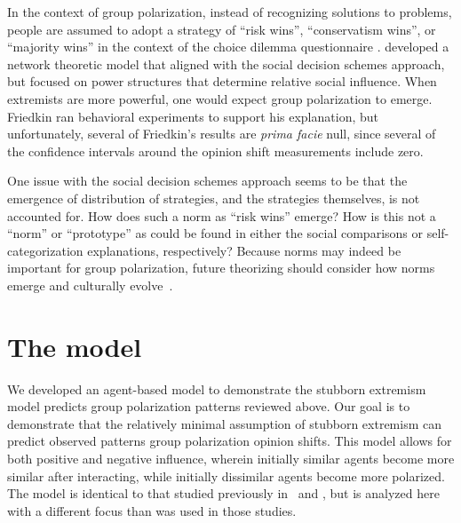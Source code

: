 In the context of group polarization, instead of recognizing solutions to
problems, people are assumed to adopt a strategy of ``risk wins'',
``conservatism wins'', or ``majority wins'' in the context of the
choice dilemma questionnaire \cite{Laughlin1982,Zuber1992}. 
 developed a network theoretic model that aligned with the
social decision schemes approach, but focused on power structures that 
determine relative social influence. When extremists are more powerful, one
would expect group polarization to emerge. 
Friedkin ran behavioral experiments to support his explanation, but
unfortunately, several of Friedkin's results are \emph{prima facie} 
null, since several of the confidence intervals around the opinion
shift measurements include zero. 

One issue with the social decision schemes approach seems to be that the
emergence of distribution of strategies, and the strategies themselves, is
not accounted for. How does such a norm as ``risk wins'' emerge? How is this
not a ``norm'' or ``prototype'' as could be found in either the social comparisons
or self-categorization explanations, respectively? Because norms may indeed be
important for group polarization, future theorizing should consider
how norms emerge and culturally 
evolve~\cite{Bicchieri2006,Bicchieri2014,Bicchieri2017}.


\section{The model}

We developed an agent-based model to demonstrate the stubborn extremism model
predicts group polarization patterns reviewed above. Our goal is to demonstrate
that the relatively minimal assumption of stubborn extremism can predict
observed patterns group polarization opinion shifts.
This model allows for both positive
and negative influence, wherein initially similar agents become more similar 
after interacting, while initially dissimilar agents become more polarized. 
The model is identical to that studied previously in~ 
and , but is analyzed here with a different focus than 
was used in those studies. 

